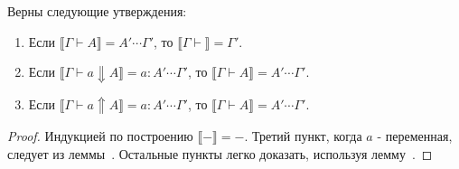 \documentclass{amsart}
\theoremstyle{definition}
\theoremstyle{remark}
\renewcommand{\ll}{\llbracket}
\newcommand{\rr}{\rrbracket}
\numberwithin{figure}{section}
\begin{document}
\begin{lem}
Верны следующие утверждения:
\begin{enumerate}
\item Если $\ll \Gamma \vdash A \rr = A' \dotsb \Gamma'$, то $\ll \Gamma \vdash \rr = \Gamma'$.
\item Если $\ll \Gamma \vdash a \Downarrow A \rr = a : A' \dotsb \Gamma'$, то $\ll \Gamma \vdash A \rr = A' \dotsb \Gamma'$.
\item Если $\ll \Gamma \vdash a \Uparrow A \rr = a : A' \dotsb \Gamma'$, то $\ll \Gamma \vdash A \rr = A' \dotsb \Gamma'$.
\begin{comment}
\item Если $\ll \Gamma, x : I' \vdash Red\ A\ B\ x \rr = H \dotsb \Gamma' \times I'$, и $\ll \Gamma \vdash A \rr = A' \dotsb \Gamma'$, то $A' = i_0(H)$, и $\ll \Gamma \vdash B \rr = i_1^*(H) \dotsb \Gamma'$.
\item Если $\ll \Gamma, x : I' \vdash Red^*\ A\ B\ x \rr = H \dotsb \Gamma' \times I'$, и $\ll \Gamma \vdash A \rr = A' \dotsb \Gamma'$, то $A' = i_0(H)$, и $\ll \Gamma \vdash B \rr = i_1^*(H) \dotsb \Gamma'$.
\item Если $\ll \Gamma, x : I' \vdash red\ a\ b\ x \Downarrow A \rr = h : \pi_1^*(A') \dotsb \Gamma' \times I'$, и $\ll \Gamma \vdash a \Downarrow A \rr = a' : A' \dotsb \Gamma'$, то $a' = i_0^*(h)$, и $\ll \Gamma \vdash b \Downarrow A \rr = i_1^*(h) : A' \dotsb \Gamma'$.
\item Если $\ll \Gamma, x : I' \vdash red^*\ a\ b\ x \Downarrow A \rr = h : \pi_1^*(A') \dotsb \Gamma' \times I'$, и $\ll \Gamma \vdash a \Downarrow A \rr = a' : A' \dotsb \Gamma'$, то $a' = i_0^*(h)$, и $\ll \Gamma \vdash b \Downarrow A \rr = i_1^*(h) : A' \dotsb \Gamma'$.
\end{comment}
\end{enumerate}
\end{lem}
\begin{proof}
Индукцией по построению $\ll - \rr = -$.
Третий пункт, когда $a$ - переменная, следует из леммы~.
Остальные пункты легко доказать, используя лемму~.
\end{proof}
\end{document}
